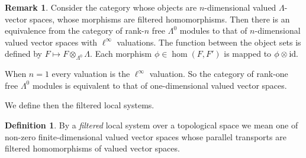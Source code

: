 \documentclass{article}
\theoremstyle{plain}%
\theoremstyle{definition}
\newtheorem{dfn}[thm]{Definition}
\newtheorem{rem}[thm]{Remark}
\numberwithin{equation}{section}
\numberwithin{figure}{section}
\def\l{\label}
\def\id{{\rm id}}
\def\ph{\phi}
\def\La{\Lambda}
\def\iy{\infty}
\begin{document}
\begin{rem}\l{rem: ell inf}
Consider the category whose objects are $n$-dimensional valued $\La$-vector spaces, whose morphisms are filtered homomorphisms.  
Then there is an equivalence from the category of rank-$n$ free $\La^0$ modules to that of $n$-dimensional valued vector spaces with $\ell^\iy$ valuations. The function between the object sets is defined by $F\mapsto F\otimes_{\La^0}\La.$ Each morphism $\ph\in\hom(F,F')$ is mapped to $\ph\otimes\id.$

When $n=1$ every valuation is the $\ell^\iy$ valuation. So the category of rank-one free $\La^0$ modules is equivalent to that of one-dimensional valued vector spaces. 
\end{rem}
We define then the filtered local systems. 
\begin{dfn}\l{dfn: loc}
By a {\it filtered} local system over a topological space we mean one of non-zero finite-dimensional valued vector spaces whose parallel transports are filtered homomorphisms of valued vector spaces.
\end{dfn}
\end{document}
